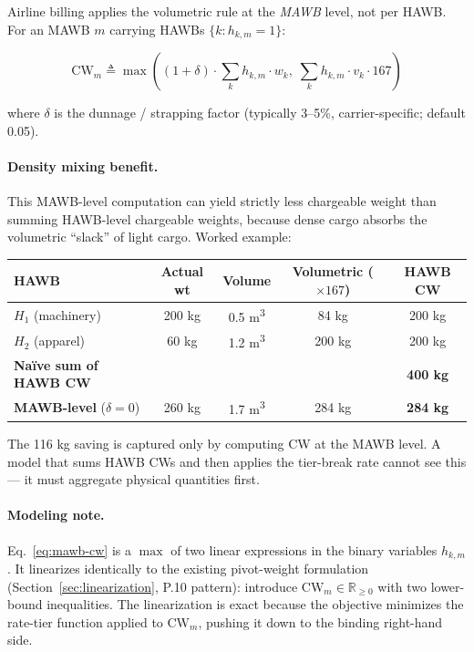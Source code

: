\documentclass[11pt,a4paper]{article}
\newcommand{\defeq}{\triangleq}
\theoremstyle{definition}
\begin{document}
Airline billing applies the volumetric rule at the \emph{MAWB} level, not per HAWB.
For an MAWB \(m\) carrying HAWBs \(\{k : h_{k,m} = 1\}\):

\begin{equation}
  \text{CW}_m \defeq \max\!\left(
    (1 + \delta) \cdot \sum_{k} h_{k,m} \cdot w_k,\;
    \sum_{k} h_{k,m} \cdot v_k \cdot 167
  \right)
  \label{eq:mawb-cw}
\end{equation}

where \(\delta\) is the dunnage / strapping factor (typically 3--5\%, carrier-specific;
default 0.05).

\paragraph{Density mixing benefit.}
This MAWB-level computation can yield strictly less chargeable weight than summing
HAWB-level chargeable weights, because dense cargo absorbs the volumetric ``slack''
of light cargo. Worked example:

\begin{center}
\begin{tabular}{lcccc}
\toprule
HAWB & Actual wt & Volume & Volumetric (\(\times 167\)) & HAWB CW \\
\midrule
\(H_1\) (machinery) & 200 kg & 0.5 m\textsuperscript{3} & 84 kg & 200 kg \\
\(H_2\) (apparel)   & 60 kg  & 1.2 m\textsuperscript{3} & 200 kg & 200 kg \\
\midrule
\textbf{Naïve sum of HAWB CW} & & & & \textbf{400 kg} \\
\textbf{MAWB-level} (\(\delta=0\)) & 260 kg & 1.7 m\textsuperscript{3} & 284 kg & \textbf{284 kg} \\
\bottomrule
\end{tabular}
\end{center}

The 116 kg saving is captured only by computing CW at the MAWB level. A model that
sums HAWB CWs and then applies the tier-break rate cannot see this — it must
aggregate physical quantities first.

\paragraph{Modeling note.}
Eq.~\eqref{eq:mawb-cw} is a \(\max\) of two linear expressions in the binary
variables \(h_{k,m}\). It linearizes identically to the existing pivot-weight
formulation (Section~\ref{sec:linearization}, P.10 pattern): introduce
\(\text{CW}_m \in \mathbb{R}_{\geq 0}\) with two lower-bound inequalities. The
linearization is exact because the objective minimizes the rate-tier function applied
to \(\text{CW}_m\), pushing it down to the binding right-hand side.
\end{document}

